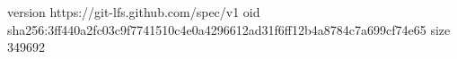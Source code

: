version https://git-lfs.github.com/spec/v1
oid sha256:3ff440a2fc03c9f7741510c4e0a4296612ad31f6ff12b4a8784c7a699cf74e65
size 349692
